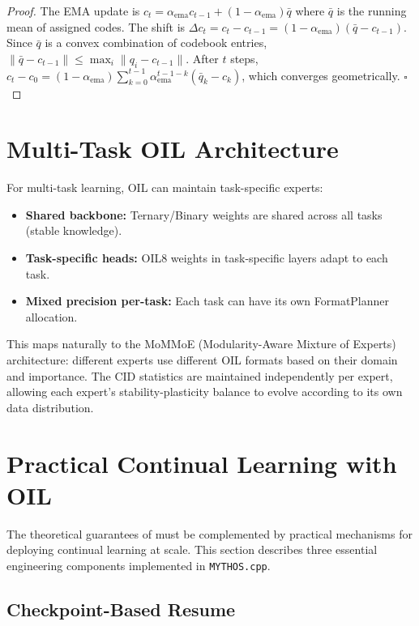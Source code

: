 \begin{proof}
The EMA update is $c_t = \alpha_{\text{ema}} c_{t-1} + (1 - \alpha_{\text{ema}}) \bar{q}$ where $\bar{q}$ is the running mean of assigned codes. The shift is $\Delta c_t = c_t - c_{t-1} = (1 - \alpha_{\text{ema}})(\bar{q} - c_{t-1})$. Since $\bar{q}$ is a convex combination of codebook entries, $\|\bar{q} - c_{t-1}\| \leq \max_i \|q_i - c_{t-1}\|$. After $t$ steps, $c_t - c_0 = (1 - \alpha_{\text{ema}}) \sum_{k=0}^{t-1} \alpha_{\text{ema}}^{t-1-k} (\bar{q}_k - c_k)$, which converges geometrically. $\square$
\end{proof}

\section{Multi-Task OIL Architecture}
\label{sec:multi_task}

For multi-task learning, OIL can maintain task-specific experts:

\begin{itemize}
    \item \textbf{Shared backbone:} Ternary/Binary weights are shared across all tasks (stable knowledge).
    \item \textbf{Task-specific heads:} OIL8 weights in task-specific layers adapt to each task.
    \item \textbf{Mixed precision per-task:} Each task can have its own FormatPlanner allocation.
\end{itemize}

This maps naturally to the MoMMoE (Modularity-Aware Mixture of Experts) architecture: different experts use different OIL formats based on their domain and importance. The CID statistics are maintained independently per expert, allowing each expert's stability-plasticity balance to evolve according to its own data distribution.

\section{Practical Continual Learning with OIL}
\label{sec:practical_cl}

The theoretical guarantees of  must be complemented by practical mechanisms for deploying continual learning at scale. This section describes three essential engineering components implemented in \texttt{MYTHOS.cpp}.

\subsection{Checkpoint-Based Resume}
\label{sec:checkpoint_resume}

